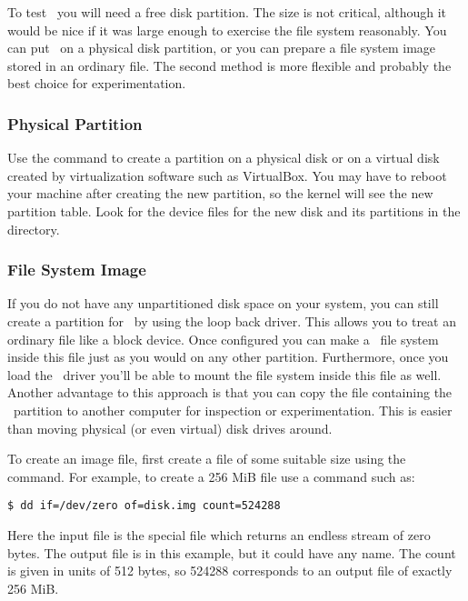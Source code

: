To test \GenericFS\ you will need a free disk partition. The size is not critical, although it
would be nice if it was large enough to exercise the file system reasonably. You can put
\GenericFS\ on a physical disk partition, or you can prepare a file system image stored in an
ordinary file. The second method is more flexible and probably the best choice for
experimentation.

\subsubsection{Physical Partition}

Use the  command to create a partition on a physical disk or on a virtual disk
created by virtualization software such as VirtualBox. You may have to reboot your machine after
creating the new partition, so the kernel will see the new partition table. Look for the device
files for the new disk and its partitions in the  directory.


\subsubsection{File System Image}

If you do not have any unpartitioned disk space on your system, you can still create a partition
for \GenericFS\ by using the loop back driver. This allows you to treat an ordinary file like a
block device. Once configured you can make a \GenericFS\ file system inside this file just as
you would on any other partition. Furthermore, once you load the \GenericFS\ driver you'll be
able to mount the file system inside this file as well. Another advantage to this approach is
that you can copy the file containing the \GenericFS\ partition to another computer for
inspection or experimentation. This is easier than moving physical (or even virtual) disk drives
around.

To create an image file, first create a file of some suitable size using the 
command. For example, to create a 256 MiB file use a command such as:
\begin{verbatim}
$ dd if=/dev/zero of=disk.img count=524288
\end{verbatim}

Here the input file is the special file  which returns an endless stream of
zero bytes. The output file is  in this example, but it could have any name.
The count is given in units of 512 bytes, so 524288 corresponds to an output file of exactly 256
MiB.

